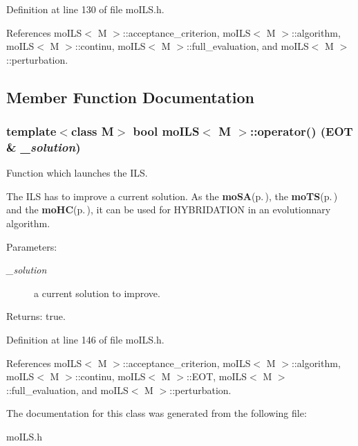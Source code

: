 Definition at line 130 of file mo\-ILS.h.

References mo\-ILS$<$ M $>$::acceptance\_\-criterion, mo\-ILS$<$ M $>$::algorithm, mo\-ILS$<$ M $>$::continu, mo\-ILS$<$ M $>$::full\_\-evaluation, and mo\-ILS$<$ M $>$::perturbation.

\subsection{Member Function Documentation}
\subsubsection{\setlength{\rightskip}{0pt plus 5cm}template$<$class M$>$ bool {\bf mo\-ILS}$<$ M $>$::operator() ({\bf EOT} \& {\em \_\-solution})\hspace{0.3cm}{\tt  [inline]}}\label{classmo_i_l_s_a4}


Function which launches the ILS. 

The ILS has to improve a current solution. As the {\bf mo\-SA}{\rm (p.\,\pageref{classmo_s_a})}, the {\bf mo\-TS}{\rm (p.\,\pageref{classmo_t_s})} and the {\bf mo\-HC}{\rm (p.\,\pageref{classmo_h_c})}, it can be used for HYBRIDATION in an evolutionnary algorithm.

\begin{Desc}
\item[Parameters:]
\begin{description}
\item[{\em \_\-solution}]a current solution to improve. \end{description}
\end{Desc}
\begin{Desc}
\item[Returns:]true. \end{Desc}


Definition at line 146 of file mo\-ILS.h.

References mo\-ILS$<$ M $>$::acceptance\_\-criterion, mo\-ILS$<$ M $>$::algorithm, mo\-ILS$<$ M $>$::continu, mo\-ILS$<$ M $>$::EOT, mo\-ILS$<$ M $>$::full\_\-evaluation, and mo\-ILS$<$ M $>$::perturbation.

The documentation for this class was generated from the following file:\begin{CompactItemize}
\item 
mo\-ILS.h\end{CompactItemize}
